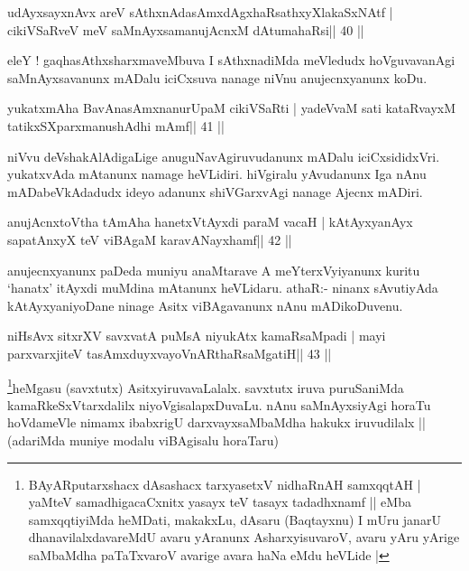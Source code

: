 \begin{shl}
udAyxsayxnAvx areV sAthxnAdasAmxdAgxhaRsathxyXlakaSxNAtf |
cikiVSaRveV meV saMnAyxsamanujAcnxM dAtumahaRsi\hfill || 40 ||
\end{shl}

\begin{artha}
eleY ! gaqhasAthxsharxmaveMbuva I sAthxnadiMda meVledudx hoVguvavanAgi saMnAyxsavanunx mADalu iciCxsuva nanage niVnu anujecnxyanunx koDu.
\end{artha}

\begin{shl}
yukatxmAha BavAnasAmxnanurUpaM cikiVSaRti |
yadeVvaM sati kataRvayxM tatikxSXparxmanushAdhi mAmf\hfill || 41 ||
\end{shl}

\begin{artha}
niVvu deVshakAlAdigaLige anuguNavAgiruvudanunx mADalu iciCxsididxVri. yukatxvAda mAtanunx namage heVLidiri. hiVgiralu yAvudanunx Iga nAnu mADabeVkAdadudx ideyo adanunx shiVGarxvAgi nanage Ajecnx mADiri.
\end{artha}


\begin{shl}
anujAcnxtoV\s tha tAmAha hanetxVtAyxdi paraM vacaH |
kAtAyxyanAyx sapatAnxyX teV viBAgaM karavANayxhamf\hfill || 42 ||
\end{shl}

\begin{artha}
anujecnxyanunx paDeda muniyu anaMtarave A meYterxVyiyanunx kuritu
`hanatx' itAyxdi muMdina mAtanunx heVLidaru. athaR:- ninanx sAvutiyAda
kAtAyxyaniyoDane ninage Asitx viBAgavanunx nAnu mADikoDuvenu.
\end{artha}


\begin{shl}
niHsAvx sitxrXV savxvatA puMsA niyukAtx kamaRsaMpadi |
mayi parxvarxjiteV tasAmxduyxvayoVnARthaRsaMgatiH\hfill || 43 ||
\end{shl}

\begin{artha}
\footnote{BAyARputarxshacx dAsashacx tarxyasetxV nidhaRnAH
  samxqqtAH | yaMteV samadhigacaCxnitx yasayx teV tasayx tadadhxnamf || eMba
  samxqqtiyiMda heMDati, makakxLu, dAsaru (Baqtayxnu) I mUru janarU
  dhanavilalxdavareMdU avaru yAranunx AsharxyisuvaroV, avaru yAru
  yArige saMbaMdha paTaTxvaroV avarige avara haNa eMdu heVLide |}heMgasu 
  (savxtutx) AsitxyiruvavaLalalx. savxtutx iruva
puruSaniMda kamaRkeSxVtarxdalilx niyoVgisalapxDuvaLu. nAnu
saMnAyxsiyAgi horaTu hoVdameVle nimamx ibabxrigU darxvayxsaMbaMdha
hakukx iruvudilalx || (adariMda muniye modalu viBAgisalu horaTaru)
\end{artha}

